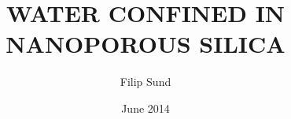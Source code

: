 \documentclass[twoside,english]{uiofysmaster}
\author{Filip Sund}
\title{\uppercase{Water confined in\\ nanoporous silica}}
\date{June 2014}
\begin{document}
\begin{titlepage}
\maketitle
\end{titlepage}
\end{document}

